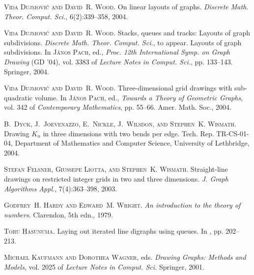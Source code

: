 \documentclass[a4paper]{article}
\theoremstyle{plain}
\begin{document}
\begin{thebibliography}{24}
\textsc{Vida Dujmovi{\'c} and David~R. Wood}.
\newblock On linear layouts of graphs.
\newblock \emph{Discrete Math. Theor. Comput. Sci.}, 6(2):339--358,
  2004{}.

\textsc{Vida Dujmovi{\'c} and David~R. Wood}.
\newblock Stacks, queues and tracks: Layouts of graph subdivisions.
\newblock \emph{Discrete Math. Theor. Comput. Sci.}, to appear.
\newblock Layouts of graph subdivisions.
\newblock In \textsc{J\'{a}nos Pach}, ed., \emph{Proc. 12th International Symp.
  on Graph Drawing} (GD '04), vol. 3383 of \emph{Lecture Notes in Comput.
  Sci.}, pp. 133--143. Springer, 2004{}.

\textsc{Vida Dujmovi{\'c} and David~R. Wood}.
\newblock Three-dimensional grid drawings with sub-quadratic volume.
\newblock In \textsc{J\'{a}nos Pach}, ed., \emph{Towards a Theory of Geometric
  Graphs}, vol. 342 of \emph{Contemporary Mathematics}, pp. 55--66. Amer. Math.
  Soc., 2004{}.

\textsc{B.~Dyck, J.~Joevenazzo, E.~Nickle, J.~Wilsdon, and Stephen~K. Wismath}.
\newblock Drawing ${K}_n$ in three dimensions with two bends per edge.
\newblock Tech. Rep. TR-CS-01-04, Department of Mathematics and Computer
  Science, University of Lethbridge, 2004.

\textsc{Stefan Felsner, Giussepe Liotta, and Stephen~K. Wismath}.
\newblock Straight-line drawings on restricted integer grids in two and three
  dimensions.
\newblock \emph{J. Graph Algorithms Appl.}, 7(4):363--398, 2003.

\textsc{Godfrey~H. Hardy and Edward~M. Wright}.
\newblock \emph{An introduction to the theory of numbers}.
\newblock Clarendon, 5th edn., 1979.

\textsc{Toru Hasunuma}.
\newblock Laying out iterated line digraphs using queues.
\newblock In  \cite{GD03}, pp. 202--213.

\textsc{Michael Kaufmann and Dorothea Wagner}, eds.
\newblock \emph{Drawing Graphs: Methods and Models}, vol. 2025 of \emph{Lecture
  Notes in Comput. Sci.}
\newblock Springer, 2001.


\end{thebibliography}
\end{document}
